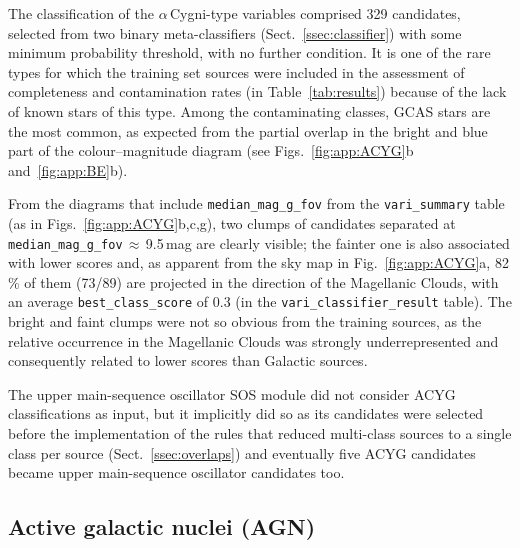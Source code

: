 \documentclass[longauth]{aa}
\begin{document}
The classification of the $\alpha$\,Cygni-type variables comprised 329 candidates, selected from two binary meta-classifiers (Sect.~\ref{ssec:classifier}) with some minimum probability threshold, with no further condition. It is one of the rare types for which the training set sources were included in the assessment of completeness and contamination rates (in Table~\ref{tab:results}) because of the lack of known stars of this type. Among the contaminating classes, GCAS stars are the most common, as expected from the partial overlap in the bright and blue part of the colour--magnitude diagram (see Figs.~\ref{fig:app:ACYG}b and~\ref{fig:app:BE}b).

From the diagrams that include \texttt{median\_mag\_g\_fov} from the \texttt{vari\_summary} table (as in Figs.~\ref{fig:app:ACYG}b,c,g), two clumps of candidates separated at  \texttt{median\_mag\_g\_fov}\,$\approx$\,9.5\,mag are clearly visible; the fainter one is also associated with lower scores and, as apparent from the sky map in Fig.~\ref{fig:app:ACYG}a, 82\,\% of them (73/89) are projected in the direction of the Magellanic Clouds, with an average \texttt{best\_class\_score} of 0.3 (in the \texttt{vari\_classifier\_result} table). The bright and faint clumps were not so obvious from the training sources, as the relative occurrence in the Magellanic Clouds was strongly underrepresented and consequently related to lower scores than Galactic sources. 

The upper main-sequence oscillator SOS module did not consider ACYG classifications as input, but it implicitly did so as its candidates were selected before the implementation of the rules that reduced multi-class sources to a single class per source (Sect.~\ref{ssec:overlaps}) and eventually five ACYG candidates became upper main-sequence oscillator candidates too.


\subsection{Active galactic nuclei (AGN)\label{ssec:agn}}
\end{document}
